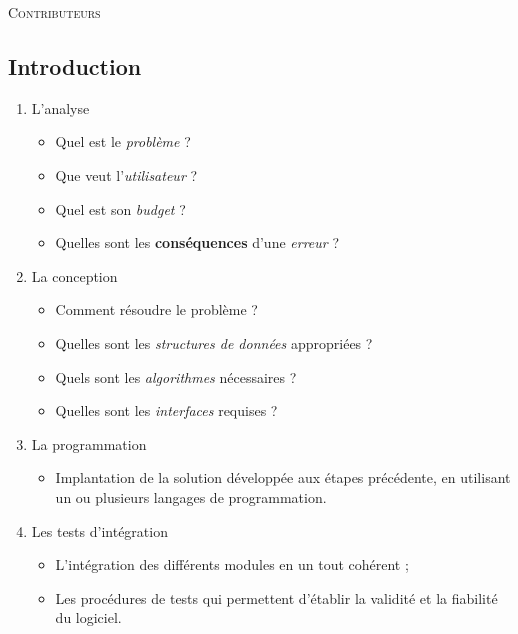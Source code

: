 \documentclass[10pt, french]{article}
\begin{document}
\begin{center}
	\textsc{\Large Contributeurs}\\[0.5cm] 
\end{center}
%

\newpage
\raggedcolumns
\begin{multicols*}{2}
\section{Introduction}

\begin{definitionNOHFILLprop}
\begin{enumerate}[label = \circled{\arabic*}{trueblue}]
	\item	L'analyse
		\begin{itemize}
		\item	Quel est le \textit{problème} ?
		\item	Que veut l'\textit{utilisateur} ?
		\item	Quel est son \textit{budget} ?
		\item	Quelles sont les \textbf{conséquences} d'une \textit{erreur} ?
		\end{itemize}
	\item	La conception
		\begin{itemize}
		\item	Comment résoudre le problème ?
		\item	Quelles sont les \textit{structures de données} appropriées ?
		\item	Quels sont les \textit{algorithmes} nécessaires ? 
		\item	Quelles sont les \textit{interfaces} requises ?
		\end{itemize}
	\item	La programmation
		\begin{itemize}
		\item	Implantation de la solution développée aux étapes précédente, en utilisant un ou plusieurs langages de programmation.
		\end{itemize}
	\item	Les tests d'intégration
		\begin{itemize}
		\item	L'intégration des différents modules en un tout cohérent ;
		\item	Les procédures de tests qui permettent d'établir la validité et la fiabilité du logiciel.
		\end{itemize}
\end{enumerate}
\end{definitionNOHFILLprop}



\end{multicols*}
\end{document}
